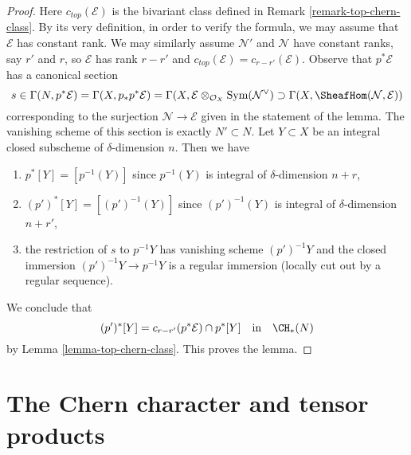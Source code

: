 \begin{proof}
Here $c_{top}(\mathcal{E})$ is the bivariant class defined in
Remark \ref{remark-top-chern-class}. By its very definition, in
order to verify the formula, we may assume that $\mathcal{E}$
has constant rank. We may similarly assume $\mathcal{N}'$ and
$\mathcal{N}$ have constant ranks, say $r'$ and $r$, so
$\mathcal{E}$ has rank $r - r'$ and
$c_{top}(\mathcal{E}) = c_{r - r'}(\mathcal{E})$.
Observe that $p^*\mathcal{E}$ has a canonical section
$$
s \in \Gamma(N, p^*\mathcal{E}) = \Gamma(X, p_*p^*\mathcal{E}) =
\Gamma(X, \mathcal{E} \otimes_{\mathcal{O}_X} \text{Sym}(\mathcal{N}^\vee)
\supset \Gamma(X, \SheafHom(\mathcal{N}, \mathcal{E}))
$$
corresponding to the surjection $\mathcal{N} \to \mathcal{E}$ given
in the statement of the lemma. The vanishing scheme of this section
is exactly $N' \subset N$. Let $Y \subset X$ be an integral closed
subscheme of $\delta$-dimension $n$. Then we have
\begin{enumerate}
\item $p^*[Y] = [p^{-1}(Y)]$ since $p^{-1}(Y)$ is integral of
$\delta$-dimension $n + r$,
\item $(p')^*[Y] = [(p')^{-1}(Y)]$ since $(p')^{-1}(Y)$ is integral of
$\delta$-dimension $n + r'$,
\item the restriction of $s$ to $p^{-1}Y$ has vanishing scheme
$(p')^{-1}Y$ and the closed immersion $(p')^{-1}Y \to p^{-1}Y$
is a regular immersion (locally cut out by a regular sequence).
\end{enumerate}
We conclude that
$$
(p')^*[Y] = c_{r - r'}(p^*\mathcal{E}) \cap p^*[Y]
\quad\text{in}\quad \CH_*(N)
$$
by Lemma \ref{lemma-top-chern-class}. This proves the lemma.
\end{proof}










\section{The Chern character and tensor products}
\label{section-chern-classes-tensor}

